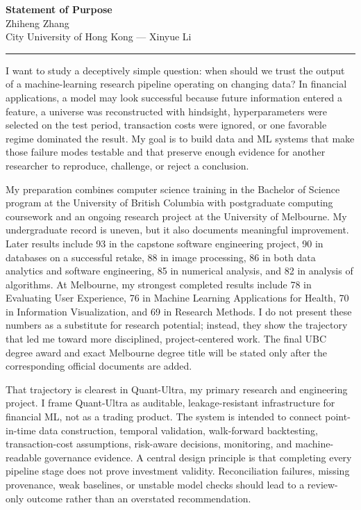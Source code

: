 \documentclass[11pt]{article}
\newcommand{\ApplicantName}{Zhiheng Zhang}
\begin{document}
\begin{center}
{\LARGE\bfseries Statement of Purpose}\\[0.25em]
{\large \ApplicantName}\\
City University of Hong Kong --- Xinyue Li
\end{center}
\vspace{0.35em}\hrule\vspace{0.65em}

I want to study a deceptively simple question: when should we trust the output of a machine-learning research pipeline operating on changing data? In financial applications, a model may look successful because future information entered a feature, a universe was reconstructed with hindsight, hyperparameters were selected on the test period, transaction costs were ignored, or one favorable regime dominated the result. My goal is to build data and ML systems that make those failure modes testable and that preserve enough evidence for another researcher to reproduce, challenge, or reject a conclusion.

My preparation combines computer science training in the Bachelor of Science program at the University of British Columbia with postgraduate computing coursework and an ongoing research project at the University of Melbourne. My undergraduate record is uneven, but it also documents meaningful improvement. Later results include 93 in the capstone software engineering project, 90 in databases on a successful retake, 88 in image processing, 86 in both data analytics and software engineering, 85 in numerical analysis, and 82 in analysis of algorithms. At Melbourne, my strongest completed results include 78 in Evaluating User Experience, 76 in Machine Learning Applications for Health, 70 in Information Visualization, and 69 in Research Methods. I do not present these numbers as a substitute for research potential; instead, they show the trajectory that led me toward more disciplined, project-centered work. The final UBC degree award and exact Melbourne degree title will be stated only after the corresponding official documents are added.

That trajectory is clearest in Quant-Ultra, my primary research and engineering project. I frame Quant-Ultra as auditable, leakage-resistant infrastructure for financial ML, not as a trading product. The system is intended to connect point-in-time data construction, temporal validation, walk-forward backtesting, transaction-cost assumptions, risk-aware decisions, monitoring, and machine-readable governance evidence. A central design principle is that completing every pipeline stage does not prove investment validity. Reconciliation failures, missing provenance, weak baselines, or unstable model checks should lead to a review-only outcome rather than an overstated recommendation.
\end{document}
